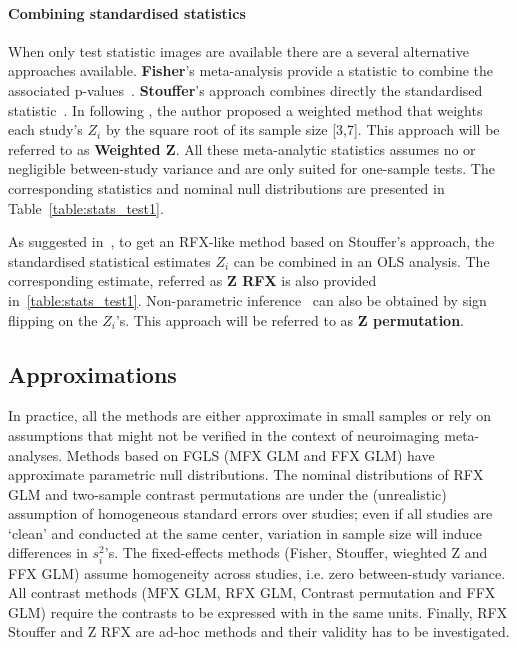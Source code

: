 \documentclass[preprint]{elsarticle}
\newcommand{\vareffect}[1][i]{s^2_{#1}}
\newcommand{\zeffect}[1][\studyidx]{Z_{#1}}
\newcommand{\studyidx}{i}
\begin{document}
\paragraph{Combining standardised statistics} 
When only test statistic images are available there are a several alternative approaches available. \textbf{Fisher}'s meta-analysis provide a statistic to combine the associated p-values~\cite{Fisher1932}. \textbf{Stouffer}'s approach combines directly the standardised statistic~\cite{Stouffer1949}. In \cite{Zaykin2011} following \cite{Liptak1958}, the author proposed a weighted method that weights each study's $\zeffect$ by the square root of its sample size [3,7]. This approach will be referred to as \textbf{Weighted Z}. All these meta-analytic statistics assumes no or negligible between-study variance and are only suited for one-sample tests. The corresponding statistics and nominal null distributions are presented in Table~\ref{table:stats_test1}.

As suggested in~\cite{Salimi-khorshidi2009}, to get an RFX-like method based on Stouffer's approach, the standardised statistical estimates $\zeffect$ can be combined in an OLS analysis. The corresponding estimate, referred as \textbf{Z RFX} is also provided in~\ref{table:stats_test1}. 
Non-parametric inference~\cite{Holmes1996,Nichols2002} can also be obtained by sign flipping on the $\zeffect$'s. This approach will be referred to as \textbf{Z permutation}.

\subsection{Approximations}  In practice, all the methods are either approximate in small samples or rely on assumptions that might not be verified in the context of neuroimaging meta-analyses. Methods based on FGLS (MFX GLM and FFX GLM) have approximate parametric null distributions. The nominal distributions of RFX GLM and two-sample contrast permutations are under the (unrealistic) assumption of homogeneous standard errors over studies; even if all studies are `clean' and conducted at the same center, variation in sample size will induce differences in $\vareffect$'s. The fixed-effects methods (Fisher, Stouffer, wieghted Z and FFX GLM) assume homogeneity across studies, i.e. zero between-study variance. All contrast methods (MFX GLM, RFX GLM, Contrast permutation and FFX GLM) require the contrasts to be expressed with in the same units. Finally, RFX Stouffer and Z RFX are ad-hoc methods and their validity has to be investigated.
\end{document}
